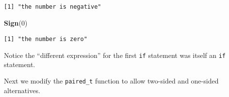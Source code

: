 \documentclass[
]{krantz}
\makeatletter
\newenvironment{Shaded}{\begin{snugshade}}{\end{snugshade}}
\newcommand{\DecValTok}[1]{\textcolor[rgb]{0.06,0.06,0.06}{#1}}
\newcommand{\KeywordTok}[1]{\textcolor[rgb]{0.27,0.27,0.27}{\textbf{#1}}}
\newcommand{\NormalTok}[1]{#1}
\newenvironment{kframe}{%
\medskip{}
\setlength{\fboxsep}{.8em}
 \def\at@end@of@kframe{}%
 \ifinner\ifhmode%
  \def\at@end@of@kframe{\end{minipage}}%
  \begin{minipage}{\columnwidth}%
 \fi\fi%
 \def\FrameCommand##1{\hskip\@totalleftmargin \hskip-\fboxsep
 \colorbox{shadecolor}{##1}\hskip-\fboxsep
     \hskip-\linewidth \hskip-\@totalleftmargin \hskip\columnwidth}%
 \MakeFramed {\advance\hsize-\width
   \@totalleftmargin\z@ \linewidth\hsize
   \@setminipage}}%
 {\par\unskip\endMakeFramed%
 \at@end@of@kframe}
\renewenvironment{Shaded}{\begin{kframe}}{\end{kframe}}
\makeatother
\begin{document}
\begin{verbatim}
[1] "the number is negative"
\end{verbatim}

\begin{Shaded}
\begin{Highlighting}[]
\KeywordTok{Sign}\NormalTok{(}\DecValTok{0}\NormalTok{)}
\end{Highlighting}
\end{Shaded}

\begin{verbatim}
[1] "the number is zero"
\end{verbatim}

Notice the ``different expression'' for the first \texttt{if} statement was itself an \texttt{if} statement.

Next we modify the \texttt{paired\_t} function to allow two-sided and one-sided alternatives.
\end{document}
